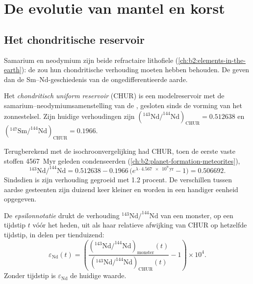\section{De evolutie van mantel en korst}

\subsection{Het chondritische reservoir}

Samarium en neodymium zijn beide refractaire lithofiele 
(\cref{ch:b2:elements-in-the-earth}): de  zou hun
chondritische verhouding moeten hebben behouden. De  geven dan de Sm--Nd-geschiedenis van de
ongedifferentieerde aarde.

\begin{definition}\label{def:b2:isotope-geochemistry:chur}
Het \emph{chondritisch uniform reservoir}
(CHUR) is een modelreservoir met de samarium--neodymiumsamenstelling van de
, gesloten sinds de vorming van het zonnestelsel. Zijn huidige
verhoudingen zijn $(^{143}\mathrm{Nd}/^{144}\mathrm{Nd})_{\mathrm{CHUR}} = 0.512638$ en
$(^{147}\mathrm{Sm}/^{144}\mathrm{Nd})_{\mathrm{CHUR}} = 0.1966$.
\end{definition}

Terugberekend met de isochroonvergelijking had CHUR, toen de eerste vaste stoffen
\qty{4567}{Myr} geleden condenseerden (\cref{ch:b2:planet-formation-meteorites}),
\[
  ^{143}\mathrm{Nd}/^{144}\mathrm{Nd} = 0.512638 - 0.1966\,\bigl(e^{\lambda\cdot
  \num{4.567e9}\,\mathrm{yr}}-1\bigr) = 0.506692 .
\] Sindsdien is zijn verhouding gegroeid met
1.2 procent. De verschillen tussen aardse gesteenten zijn duizend keer
kleiner en worden in een handiger eenheid opgegeven.

\begin{definition}[Epsilonnotatie]\label{def:b2:isotope-geochemistry:epsilon}
De \emph{epsilonnotatie} drukt de verhouding
$^{143}\mathrm{Nd}/^{144}\mathrm{Nd}$ van een monster, op een tijdstip $t$ vóór het
heden, uit als haar relatieve afwijking van CHUR op hetzelfde tijdstip, in delen per
tienduizend:
\[
  \varepsilon_{\mathrm{Nd}}(t) = \left(
  \frac{(^{143}\mathrm{Nd}/^{144}\mathrm{Nd})_{\text{monster}}(t)}
       {(^{143}\mathrm{Nd}/^{144}\mathrm{Nd})_{\mathrm{CHUR}}(t)} - 1\right)\times 10^4 .
\]
Zonder tijdstip is $\varepsilon_{\mathrm{Nd}}$ de huidige waarde.
\end{definition}

